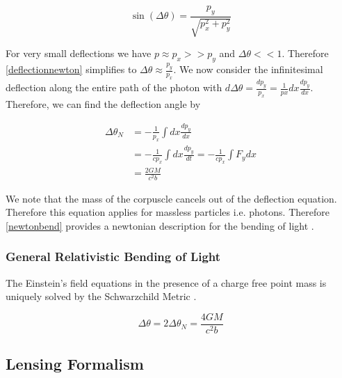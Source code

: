 \begin{equation}
  \sin(\Delta \theta) = \frac{p_y}{\sqrt{p_x^2+p_y^2}}
  \label{deflectionnewton}
\end{equation}

\par For very small deflections we have $p\approx p_x >> p_y$ and $\Delta \theta << 1$. 
Therefore \autoref{deflectionnewton} simplifies to $\Delta \theta
\approx \frac{p_y}{p_x}$. We now consider the infinitesimal deflection along the entire path of the photon with
$d\Delta \theta = \frac{dp_y}{p_x} = \frac{1}{px} dx \frac{dp_y}{dx}$. Therefore, we can find the deflection
angle by 

\begin{equation}
  \begin{split}
  \Delta \theta_N &= -\frac{1}{p_x} \int dx \frac{dp_y}{dx} \\
  &= -\frac{1}{cp_x} \int dx \frac{dp_y}{dt} = -\frac{1}{cp_x} \int F_y dx \\ 
  &= \frac{2GM}{c^2b}
  \end{split}  
  \label{newtonbend}
\end{equation}

We note that the mass of the corpuscle cancels out of the deflection equation. Therefore this equation applies
for massless particles i.e. photons. Therefore \autoref{newtonbend} provides a newtonian description for the 
bending of light \cite{lensingbook}.

\subsubsection{General Relativistic Bending of Light}
The Einstein's field equations in the presence of a charge free point mass is uniquely solved by 
the Schwarzchild Metric 
\cite{}.

\begin{equation}
  \Delta \theta = 2\Delta \theta_N=\frac{4GM}{c^2b}
  \label{grbend}
\end{equation}

\subsection{Lensing Formalism}
\cite{basicLens}
